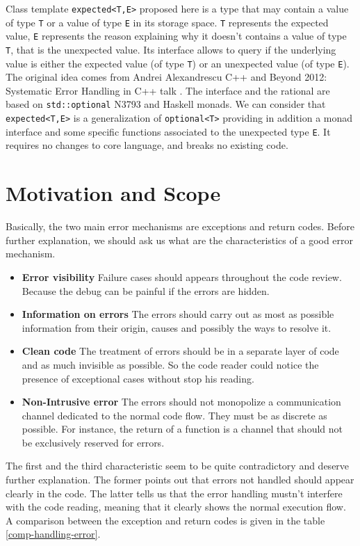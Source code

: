 \documentclass[a4paper,10pt]{article}
\newcommand{\cpp}[1]{\lstinline{#1}}
\begin{document}
Class template \cpp{expected<T,E>} proposed here is a type that may contain a value of type \cpp{T} or a value of type \cpp{E} in its storage space. \cpp{T} represents the expected value, \cpp{E} represents the reason explaining why it doesn't contains a value of type \cpp{T}, that is the unexpected value. Its interface allows to query if the underlying value is either the expected value (of type \cpp{T}) or an unexpected value (of type \cpp{E}). The original idea comes from Andrei Alexandrescu C++ and Beyond 2012: Systematic Error Handling in C++ talk \cite{AlexandrescuExpected}. The interface and the rational are based on \cpp{std::optional} N3793 \cite{OptionalRev5} and Haskell monads. We can consider that \cpp{expected<T,E>} is a generalization of \cpp{optional<T>} providing in addition a monad interface and some specific functions associated to the unexpected type \cpp{E}. It requires no changes to core language, and breaks no existing code.

\section{Motivation and Scope}
\label{motiv-scope}

Basically, the two main error mechanisms are exceptions and return codes. Before further explanation, we should ask us what are the characteristics of a good error mechanism.

\begin{itemize}
 \item \textbf{Error visibility} Failure cases should appears throughout the code review. Because the debug can be painful if the errors are hidden.
 \item \textbf{Information on errors} The errors should carry out as most as possible information from their origin, causes and possibly the ways to resolve it.
 \item \textbf{Clean code} The treatment of errors should be in a separate layer of code and as much invisible as possible. So the code reader could notice the presence of exceptional cases without stop his reading.
 \item \textbf{Non-Intrusive error} The errors should not monopolize a communication channel dedicated to the normal code flow. They must be as discrete as possible. For instance, the return of a function is a channel that should not be exclusively reserved for errors.
\end{itemize}

The first and the third characteristic seem to be quite contradictory and deserve further explanation. The former points out that errors not handled should appear clearly in the code. The latter tells us that the error handling mustn't interfere with the code reading, meaning that it clearly shows the normal execution flow. A comparison between the exception and return codes is given in the table \ref{comp-handling-error}.
\end{document}
